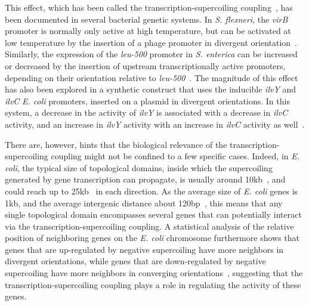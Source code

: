 This effect, which has been called the transcription-supercoiling coupling~\citep{meyer2014,sobetzko2016,elhoudaigui2019}, has been documented in several bacterial genetic systems.
In \emph{S. flexneri}, the \emph{virB} promoter is normally only active at high temperature, but can be activated at low temperature by the insertion of a phage promoter in divergent orientation~\citep{tobe1995}.
Similarly, the expression of the \emph{leu-500} promoter in \emph{S. enterica} can be increased or decreased by the insertion of upstream transcriptionally active promoters, depending on their orientation relative to \emph{leu-500}~\citep{elhanafi2000}.
The magnitude of this effect has also been explored in a synthetic construct that uses the inducible \emph{ilvY} and \emph{ilvC} \emph{E. coli} promoters, inserted on a plasmid in divergent orientations.
In this system, a decrease in the activity of \emph{ilvY} is associated with a decrease in \emph{ilvC} activity, and an increase in \emph{ilvY} activity with an increase in \emph{ilvC} activity as well~\citep{rhee1999}.

There are, however, hints that the biological relevance of the transcription-supercoiling coupling might not be confined to a few specific cases.
Indeed, in \emph{E. coli}, the typical size of topological domains, inside which the supercoiling generated by gene transcription can propagate, is usually around 10kb~\citep{postow2004}, and could reach up to 25kb~\citep{visser2022} in each direction.
As the average size of \emph{E. coli} genes is 1kb, and the average intergenic distance about 120bp~\citep{blattner1997}, this means that any single topological domain encompasses several genes that can potentially interact via the transcription-supercoiling coupling.
A statistical analysis of the relative position of neighboring genes on the \emph{E. coli} chromosome furthermore shows that genes that are up-regulated by negative supercoiling have more neighbors in divergent orientations, while genes that are down-regulated by negative supercoiling have more neighbors in converging orientations~\citep{sobetzko2016}, suggesting that the transcription-supercoiling coupling plays a role in regulating the activity of these genes.

